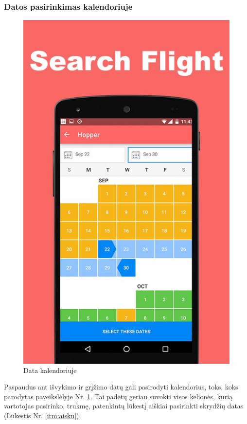 \documentclass{VUMIFPSkursinis}
\begin{document}
\subsubsection{Datos pasirinkimas kalendoriuje}
\begin{figure}[H]
    \centering
    \includegraphics[scale=0.6]{img/hopper.jpg}
    \caption{Data kalendoriuje}
    \label{img:data1}
\end{figure}
Paspaudus ant išvykimo ir grįžimo datų gali pasirodyti kalendorius, toks, koks parodytas paveikslėlyje Nr. \ref{img:data1}. Tai padėtų geriau suvokti visos kelionės, kurią vartotojas pasirinko, trukmę, patenkintų lūkestį aiškiai pasirinkti skrydžių datas (Lūkestis Nr. \ref{itm:aisku}).
\end{document}
